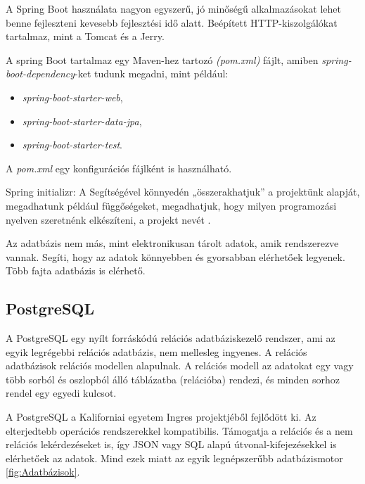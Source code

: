 A Spring Boot használata nagyon egyszerű, jó minőségű alkalmazásokat lehet benne fejleszteni kevesebb fejlesztési idő alatt. Beépített HTTP-kiszolgálókat tartalmaz, mint a Tomcat és a Jerry.

A spring Boot tartalmaz egy Maven-hez tartozó \textit{(pom.xml)} fájlt, amiben \textit{spring-boot-dependency}-ket tudunk megadni, mint például:

\begin{itemize}
\item \textit{spring-boot-starter-web},
\item \textit{spring-boot-starter-data-jpa},
\item \textit{spring-boot-starter-test}.
\end{itemize}

A \textit{pom.xml} egy konfigurációs fájlként is használható.

Spring initializr: A Segítségével könnyedén „összerakhatjuk” a projektünk alapját, megadhatunk például függőségeket, megadhatjuk, hogy milyen programozási nyelven szeretnénk elkészíteni, a projekt nevét \cite{SpringBoot}.

Az adatbázis nem más, mint elektronikusan tárolt adatok, amik rendszerezve vannak. Segíti, hogy az adatok könnyebben és gyorsabban elérhetőek legyenek. Több fajta adatbázis is elérhető.


\subsection{PostgreSQL}

A PostgreSQL \cite{PostgreSQL} egy nyílt forráskódú relációs adatbáziskezelő rendszer, ami az egyik legrégebbi relációs adatbázis, nem mellesleg ingyenes. A relációs adatbázisok relációs modellen alapulnak. A relációs modell az adatokat egy vagy több sorból és oszlopból álló táblázatba (relációba) rendezi, és minden sorhoz rendel egy egyedi kulcsot.

A PostgreSQL a Kaliforniai egyetem Ingres projektjéből fejlődött ki. Az elterjedtebb operációs rendszerekkel kompatibilis. Támogatja a relációs és a nem relációs lekérdezéseket is, így JSON vagy SQL alapú útvonal-kifejezésekkel is elérhetőek az adatok.  Mind ezek miatt az egyik legnépszerűbb adatbázismotor \ref{fig:Adatbázisok}.

